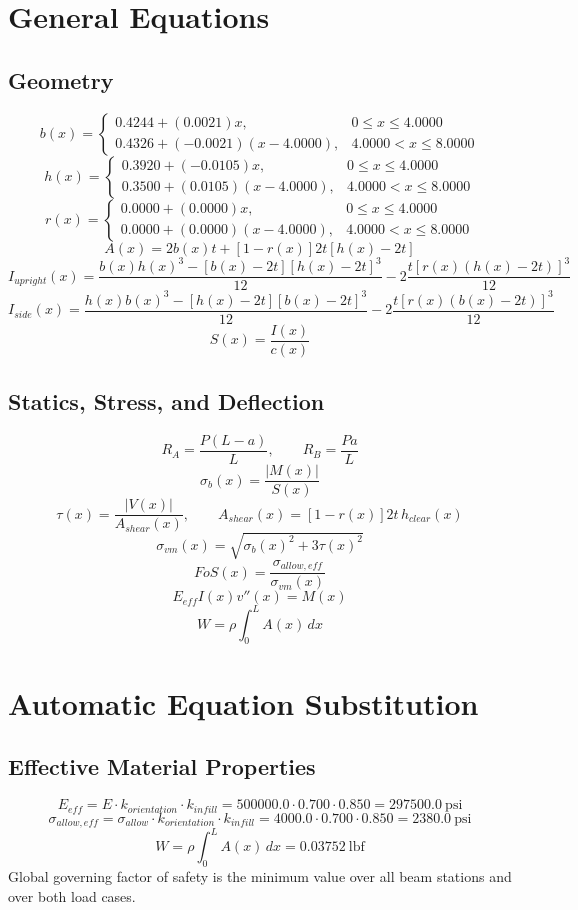\documentclass[11pt]{article}
\begin{document}
\section*{General Equations}
\subsection*{Geometry}
\[
b(x)=\begin{cases}0.4244 + (0.0021)x, & 0 \le x \le 4.0000\\0.4326 + (-0.0021)(x-4.0000), & 4.0000 < x \le 8.0000\end{cases}
\]
\[
h(x)=\begin{cases}0.3920 + (-0.0105)x, & 0 \le x \le 4.0000\\0.3500 + (0.0105)(x-4.0000), & 4.0000 < x \le 8.0000\end{cases}
\]
\[
r(x)=\begin{cases}0.0000 + (0.0000)x, & 0 \le x \le 4.0000\\0.0000 + (0.0000)(x-4.0000), & 4.0000 < x \le 8.0000\end{cases}
\]
\[
A(x)=2b(x)t+[1-r(x)]2t[h(x)-2t]
\]
\[
I_{upright}(x)=\frac{b(x)h(x)^3-[b(x)-2t][h(x)-2t]^3}{12}-2\frac{t[r(x)(h(x)-2t)]^3}{12}
\]
\[
I_{side}(x)=\frac{h(x)b(x)^3-[h(x)-2t][b(x)-2t]^3}{12}-2\frac{t[r(x)(b(x)-2t)]^3}{12}
\]
\[
S(x)=\frac{I(x)}{c(x)}
\]

\subsection*{Statics, Stress, and Deflection}
\[
R_A=\frac{P(L-a)}{L}, \qquad R_B=\frac{Pa}{L}
\]
\[
\sigma_b(x)=\frac{|M(x)|}{S(x)}
\]
\[
\tau(x)=\frac{|V(x)|}{A_{shear}(x)}, \qquad A_{shear}(x)=[1-r(x)]2t\,h_{clear}(x)
\]
\[
\sigma_{vm}(x)=\sqrt{\sigma_b(x)^2+3\tau(x)^2}
\]
\[
FoS(x)=\frac{\sigma_{allow,eff}}{\sigma_{vm}(x)}
\]
\[
E_{eff}I(x)v''(x)=M(x)
\]
\[
W=\rho\int_0^L A(x)\,dx
\]

\section*{Automatic Equation Substitution}
\subsection*{Effective Material Properties}
\[E_{eff} = E \cdot k_{orientation} \cdot k_{infill} = 500000.0 \cdot 0.700 \cdot 0.850 = 297500.0\ \mathrm{psi}\]
\[\sigma_{allow,eff} = \sigma_{allow} \cdot k_{orientation} \cdot k_{infill} = 4000.0 \cdot 0.700 \cdot 0.850 = 2380.0\ \mathrm{psi}\]
\[W = \rho \int_0^L A(x)\,dx = 0.03752\ \mathrm{lbf}\]
Global governing factor of safety is the minimum value over all beam stations and over both load cases.
\end{document}
